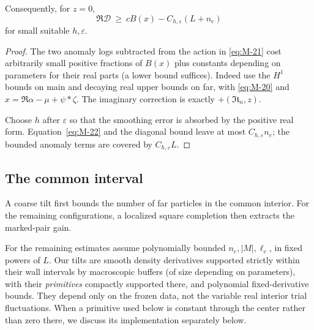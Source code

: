 \begin{corollary}\label{cor:07_magnetic_analysis-unshifted}
Consequently, for \(z=0\),
\begin{equation}
 \Re\mathcal D\ \ge\ c B(x)-C_{h,\varepsilon}(L+n_e)
 \label{eq:M-23}
\end{equation}
for small suitable \(h,\varepsilon\). 
\end{corollary}
\begin{proof}
The two anomaly logs subtracted from the action in \eqref{eq:M-21} cost arbitrarily small positive fractions of \(B(x)\) plus constants depending on parameters for their real parts (a lower bound suffices). Indeed use the \(H^1\) bounds on main and decaying real upper bounds on far, with \eqref{eq:M-20} and \(x=\Re\alpha-\mu+\psi*\zeta\). The imaginary correction is exactly \(+(\Im\mathfrak t_n,z)\).

Choose \(h\) after \(\varepsilon\) so that the smoothing error is absorbed by the positive real form. Equation~\eqref{eq:M-22} and the diagonal bound leave at most \(C_{h,\varepsilon}n_e\); the bounded anomaly terms are covered by \(C_{h,\varepsilon}L\).
\end{proof}

\subsection{The common interval}

A coarse tilt first bounds the number of far particles in the common
interior. For the remaining configurations, a localized square completion
then extracts the marked-pair gain.

For the remaining estimates assume polynomially bounded \(n_e,|M|,\ell_e\), in fixed powers of \(L\). Our tilts are smooth density derivatives supported strictly within their wall intervals by macroscopic buffers (of size depending on parameters), with their \emph{primitives} compactly supported there, and polynomial fixed-derivative bounds. They depend only on the frozen data, not the variable real interior trial fluctuations. When a primitive used below is constant through the center rather than zero there, we discuss its implementation separately below.


